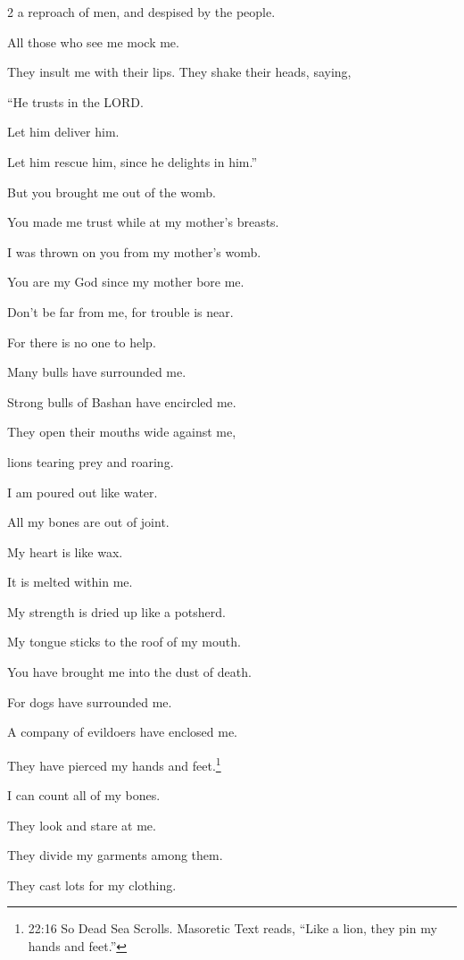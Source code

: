 \begin{multicols}{2}
	a reproach of men, and despised by the people.
	
	
	\myverse{}All those who see me mock me.
	
	They insult me with their lips. They shake their heads, saying,
	
	
	\myverse{}“He trusts in the LORD.
	
	Let him deliver him.
	
	Let him rescue him, since he delights in him.”
	
	
	\myverse{}But you brought me out of the womb.
	
	You made me trust while at my mother’s breasts.
	
	
	\myverse{}I was thrown on you from my mother’s womb.
	
	You are my God since my mother bore me.
	
	
	\myverse{}Don’t be far from me, for trouble is near.
	
	For there is no one to help.
	
	
	\myverse{}Many bulls have surrounded me.
	
	Strong bulls of Bashan have encircled me.
	
	
	\myverse{}They open their mouths wide against me,
	
	lions tearing prey and roaring.
	
	
	\myverse{}I am poured out like water.
	
	All my bones are out of joint.
	
	My heart is like wax.
	
	It is melted within me.
	
	
	\myverse{}My strength is dried up like a potsherd.
	
	My tongue sticks to the roof of my mouth.
	
	You have brought me into the dust of death.
	
	
	\myverse{}For dogs have surrounded me.
	
	A company of evildoers have enclosed me.
	
	They have pierced my hands and feet.\footnote{22:16 So Dead Sea Scrolls. Masoretic Text reads, “Like a lion, they pin my hands and feet.”}
	
	
	\myverse{}I can count all of my bones.
	
	They look and stare at me.
	
	
	\myverse{}They divide my garments among them.
	
	They cast lots for my clothing.
	

\end{multicols}
